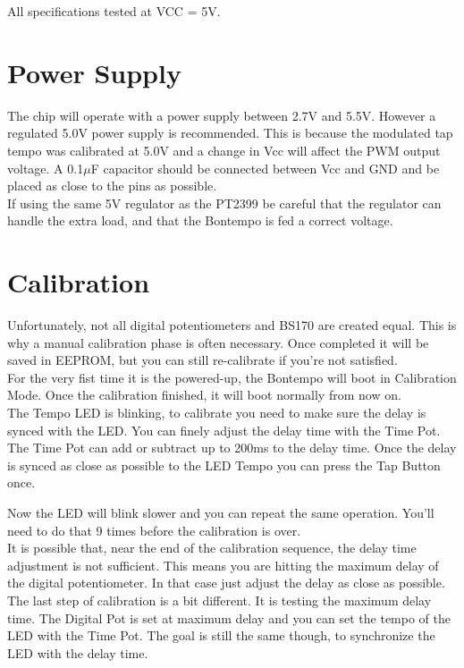 \documentclass[a4paper, 10pt]{article}
\begin{document}
All specifications tested at VCC = 5V.

\section{Power Supply}
\bigbreak
The chip will operate with a power supply between 2.7V and 5.5V.
However a regulated 5.0V power supply is recommended. This is because the modulated tap tempo was calibrated at 5.0V and a change in Vcc will affect the PWM output voltage.
A 0.1$\mu$F capacitor should be connected between Vcc and GND and be placed as close to the pins as possible.\\

If using the same 5V regulator as the PT2399 be careful that the regulator can handle the extra load, and that the Bontempo is fed a correct voltage. \\

\section{Calibration}
\label{sec:calib}
\bigbreak
Unfortunately, not all digital potentiometers and BS170 are created equal. This is why a manual calibration phase is often necessary. Once completed it will be saved in EEPROM, but you can still re-calibrate if you're not satisfied.\\

For the very fist time it is the powered-up, the Bontempo will boot in Calibration Mode. Once the calibration finished, it will boot normally from now on.\\

The Tempo LED is blinking, to calibrate you need to make sure the delay is synced with the LED. You can finely adjust the delay time with the Time Pot. The Time Pot can add or subtract up to 200ms to the delay time. Once the delay is synced as close as possible to the LED Tempo you can press the Tap Button once.

Now the LED will blink slower and you can repeat the same operation. You'll need to do that 9 times before the calibration is over.\\

It is possible that, near the end of the calibration sequence, the delay time adjustment is not sufficient. This means you are hitting the maximum delay of the digital potentiometer. In that case just adjust the delay as close as possible.\\

The last step of calibration is a bit different. It is testing the maximum delay time. The Digital Pot is set at maximum delay and you can set the tempo of the LED with the Time Pot. The goal is still the same though, to synchronize the LED with the delay time.\\
\end{document}
